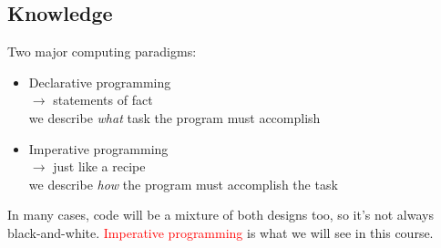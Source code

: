 \documentclass[t,handout,9pt]{beamer}
\begin{document}
\subsection{Knowledge}
\begin{frame}
\vfill
Two major computing paradigms:
\begin{itemize}
	\item Declarative programming\\
	$\rightarrow$ statements of fact\\
	\qquad we describe \textit{what} task the program must accomplish
	\item Imperative programming\\
	$\rightarrow$ just like a recipe\\
	\qquad we describe \textit{how} the program must accomplish the task
\end{itemize}
\vfill
In many cases, code will be a mixture of both designs too, so it's not always black-and-white.
\vfill
\textcolor{red}{Imperative programming} is what we will see in this course.
\vfill
\end{frame}
%
\end{document}
